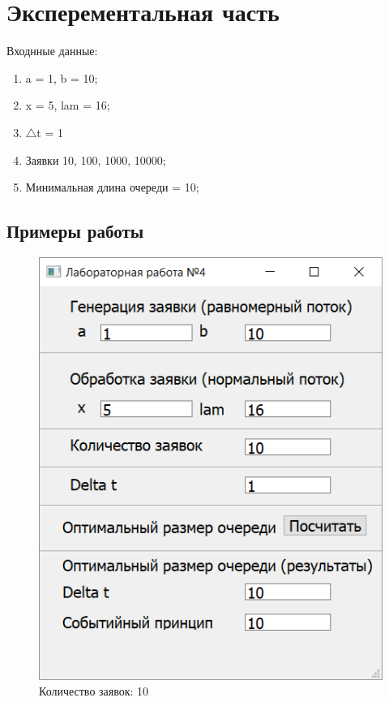 \section{Эксперементальная часть}

Входнные данные:
\begin{enumerate}
	\item a = 1, b = 10;
	\item x = 5, lam = 16;
	\item $\triangle$t = 1
	\item Заявки 10, 100, 1000, 10000;
	\item Минимальная длина очереди = 10;
\end{enumerate}

\subsection{Примеры работы}

\begin{figure}[h]
	\centering
	\includegraphics[width=0.7\linewidth]{src/resut_10}
	\caption{Количество заявок: 10}
	\label{fig:resut10}
\end{figure}

